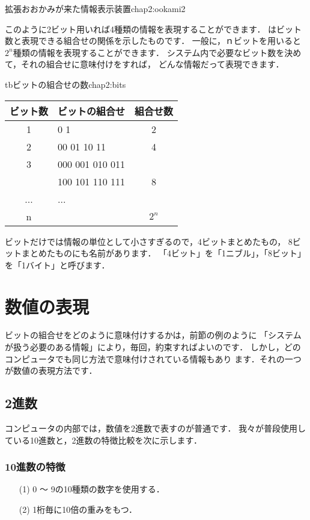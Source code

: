           {拡張おおかみが来た情報表示装置}{chap2:ookami2}

このように2ビット用いれば4種類の情報を表現することができます．
はビット数と表現できる組合せの関係を示したものです．
一般に，ｎビットを用いると$2^n$種類の情報を表現することができます．
システム内で必要なビット数を決めて，それの組合せに意味付けをすれば，
どんな情報だって表現できます．

\begin{mytable}{tb}{ビットの組合せの数}{chap2:bits}
{\small\begin{tabular}{c|l|c} \hline\hline
ビット数 & \multicolumn{1}{c|}{ビットの組合せ} & 組合せ数\\
\hline
1 & 0 1   & 2 \\
2 & 00 01 10 11 & 4 \\
3 & 000 001 010 011 &   \\
  & 100 101 110 111 & 8 \\
...& ... &\\
n &  & $2^n$ \\
\end{tabular}}
\end{mytable}

ビットだけでは情報の単位として小さすぎるので，4ビットまとめたもの，
8ビットまとめたものにも名前があります．
「4ビット」を「1ニブル」，「8ビット」を「1バイト」と呼びます．

\section{数値の表現}

ビットの組合せをどのように意味付けするかは，前節の例のように
「システムが扱う必要のある情報」により，毎回，約束すればよいのです．
しかし，どのコンピュータでも同じ方法で意味付けされている情報もあり
ます．それの一つが数値の表現方法です．

\subsection{2進数}

コンピュータの内部では，数値を2進数で表すのが普通です．
我々が普段使用している10進数と，2進数の特徴比較を次に示します．

\subsubsection{10進数の特徴}
\begin{enumerate}
\item[(1)] 0 〜 9の10種類の数字を使用する．
\item[(2)] 1桁毎に10倍の重みをもつ．
\end{enumerate}
